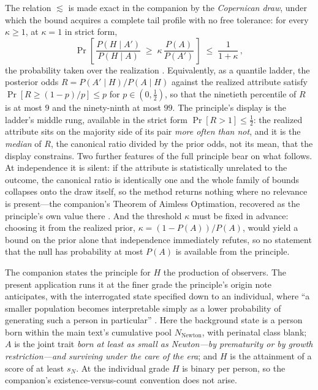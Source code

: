 \documentclass{article}
\begin{document}
\noindent The relation $\lesssim$ is made exact in the companion by the \emph{Copernican draw}, under which the bound acquires a complete tail profile with no free tolerance: for every $\kappa \ge 1$, at $\kappa = 1$ in strict form,
\begin{equation}\label{eq:app-exceed}
  \Pr\!\left[\,\frac{P(H \mid A')}{P(H \mid A)} \;\geq\; \kappa\,\frac{P(A)}{P(A')}\,\right] \;\leq\; \frac{1}{1+\kappa}\,,
\end{equation}
the probability taken over the realization \cite{NexicFoundation}. Equivalently, as a quantile ladder, the posterior odds $R = P(A' \mid H)/P(A \mid H)$ against the realized attribute satisfy $\Pr[R \geq (1-p)/p] \leq p$ for $p \in (0, \tfrac12)$, so that the ninetieth percentile of $R$ is at most $9$ and the ninety-ninth at most $99$. The principle's display is the ladder's middle rung, available in the strict form $\Pr[R > 1] \leq \tfrac12$: the realized attribute sits on the majority side of its pair \emph{more often than not}, and it is the \emph{median} of $R$, the canonical ratio divided by the prior odds, not its mean, that the display constrains. Two further features of the full principle bear on what follows. At independence it is silent: if the attribute is statistically unrelated to the outcome, the canonical ratio is identically one and the whole family of bounds collapses onto the draw itself, so the method returns nothing where no relevance is present---the companion's Theorem of Aimless Optimation, recovered as the principle's own value there \cite{NexicFoundation}. And the threshold $\kappa$ must be fixed in advance: choosing it from the realized prior, $\kappa = (1-P(A))/P(A)$, would yield a bound on the prior alone that independence immediately refutes, so no statement that the null has probability at most $P(A)$ is available from the principle.

The companion states the principle for $H$ the production of observers. The present application runs it at the finer grade the principle's origin note anticipates, with the interrogated state specified down to an individual, where ``a smaller population becomes interpretable simply as a lower probability of generating such a person in particular'' \cite{NexicFoundation}. Here the background state is a person born within the main text's cumulative pool $N_{\mathrm{Newton}}$, with perinatal class blank; $A$ is the joint trait \emph{born at least as small as Newton---by prematurity or by growth restriction---and surviving under the care of the era}; and $H$ is the attainment of a score of at least $s_N$. At the individual grade $H$ is binary per person, so the companion's existence-versus-count convention does not arise.
\end{document}
